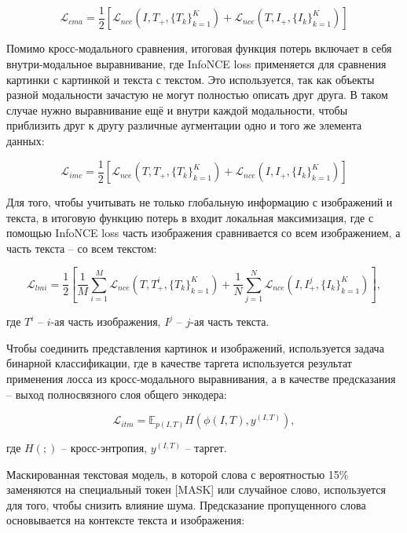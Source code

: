 \documentclass[a4paper, 14pt]{article}
\begin{document}
\begin{equation}\label{eq:cma}
    \mathcal{L}_{cma} = \frac{1}{2}[\mathcal{L}_{nce}(I, T_+, \{T_k\}_{k=1}^K) + \mathcal{L}_{nce}(T, I_+, \{I_k\}_{k=1}^K)]
\end{equation}

Помимо кросс-модального сравнения, итоговая функция потерь включает в себя
внутри-модальное выравнивание, где InfoNCE loss применяется для сравнения картинки с картинкой и текста с текстом. Это используется, так как объекты разной модальности зачастую не могут полностью описать друг друга. В таком случае нужно выравнивание ещё и внутри каждой модальности, чтобы приблизить друг к другу различные аугментации одно и того же элемента данных:

\begin{equation}\label{eq:imc}
    \mathcal{L}_{imc} = \frac{1}{2}[\mathcal{L}_{nce}(T, T_+, \{T_k\}_{k=1}^K) + \mathcal{L}_{nce}(I, I_+, \{I_k\}_{k=1}^K)]
\end{equation}

Для того, чтобы учитывать не только глобальную информацию с изображений и текста, в итоговую функцию потерь в \citep{TCL} входит локальная максимизация, где с помощью InfoNCE loss часть изображения сравнивается со всем изображением, а часть текста -- со всем текстом:

\begin{equation}\label{eq:lmi}
    \mathcal{L}_{lmi} = \frac{1}{2}\left[\frac{1}{M}\sum\limits_{i=1}^M\mathcal{L}_{nce}(T, T_+^i, \{T_k\}_{k=1}^K) + \frac{1}{N}\sum\limits_{j=1}^N\mathcal{L}_{nce}(I, I_+^j, \{I_k\}_{k=1}^K)\right],
\end{equation}

\noindent где $T^i$ -- $i$-ая часть изображения, $I^j$ -- $j$-ая часть текста.

Чтобы соединить представления картинок и изображений, используется задача бинарной классификации, где в качестве таргета используется результат применения лосса из кросс-модального выравнивания, а в качестве предсказания -- выход полносвязного слоя общего энкодера:

\begin{equation}
    \mathcal{L}_{itm} = \mathbb{E}_{p(I, T)}H(\phi(I, T), y^{(I, T)}),
\end{equation}

\noindent где $H(;)$ -- кросс-энтропия, $y^{(I, T)}$ -- таргет.

Маскированная текстовая модель, в которой слова с вероятностью 15\% заменяются на специальный токен [MASK] или случайное слово, используется для того, чтобы снизить влияние шума. Предсказание пропущенного слова основывается на контексте текста и изображения:
\end{document}
